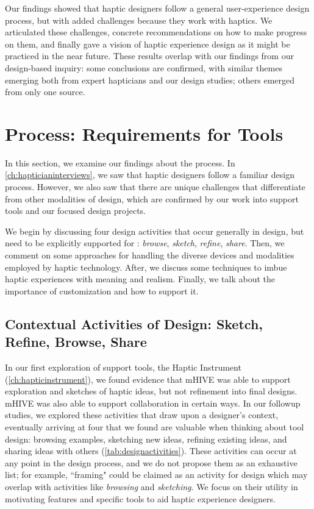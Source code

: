 Our findings showed that haptic designers follow a general user-experience design process, but with added challenges because they work with haptics.
We articulated these challenges,  concrete recommendations on how to make progress on them, and finally gave a vision of haptic experience design as it might be practiced in the near future.
These results overlap with our findings from our design-based inquiry: some conclusions are confirmed, with similar themes emerging both from expert hapticians and our design studies; others emerged from only one source.


%
%
\section{\haxd Process: Requirements for Tools}
In this section, we examine our findings about the \haxd process. %
In \autoref{ch:hapticianinterviews}, we saw that haptic designers follow a familiar design process.
However, we also saw that there are unique challenges that differentiate \haxd from other modalities of design, which are confirmed by our work into \haxd support tools and our focused design projects.

We begin by discussing four design activities that occur generally in design, but need to be explicitly supported for \haxd: \emph{browse}, \emph{sketch}, \emph{refine}, \emph{share}.
Then, we comment on some approaches for handling the diverse devices and modalities employed by haptic technology.
After, we discuss some techniques to imbue haptic experiences with meaning and realism.
Finally, we talk about the importance of customization and how to support it.

\subsection{Contextual Activities of Design: Sketch, Refine, Browse, Share}
In our first exploration of \haxd support tools, the Haptic Instrument (\autoref{ch:hapticinstrument}), we found evidence that mHIVE was able to support exploration and sketches of haptic ideas, but not refinement into final designs.
mHIVE was also able to support collaboration in certain ways.
In our followup studies, we explored these activities that draw upon a designer's context, eventually arriving at four that we found are valuable when thinking about tool design: browsing examples, sketching new ideas, refining existing ideas, and sharing ideas with others (\autoref{tab:designactivities}).
These activities can occur at any point in the design process, and we do not propose them as an exhaustive list; for example, ``framing" \cite{Schon1982,Warr2005} could be claimed as an activity for design which may overlap with activities like \emph{browsing} and \emph{sketching}.
We focus on their utility in motivating features and specific tools to aid haptic experience designers.





